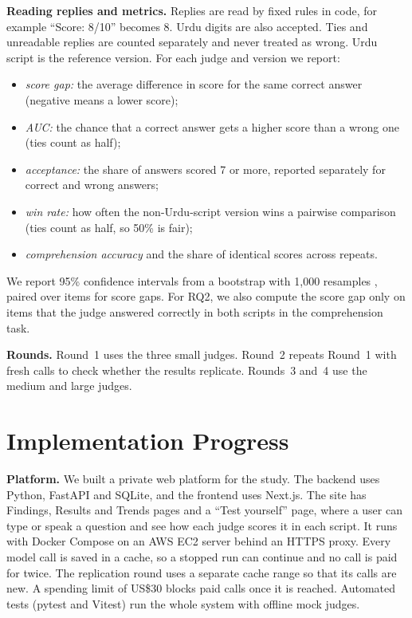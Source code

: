 \documentclass[conference]{IEEEtran}
\begin{document}
\textbf{Reading replies and metrics.} Replies are read by fixed rules in code, for example ``Score: 8/10'' becomes 8.
Urdu digits are also accepted. Ties and unreadable replies are counted separately and never treated as wrong. Urdu
script is the reference version. For each judge and version we report:
\begin{itemize}
\item \emph{score gap:} the average difference in score for the same correct answer (negative means a lower score);
\item \emph{AUC:} the chance that a correct answer gets a higher score than a wrong one (ties count as half);
\item \emph{acceptance:} the share of answers scored 7 or more, reported separately for correct and wrong answers;
\item \emph{win rate:} how often the non-Urdu-script version wins a pairwise comparison (ties count as half, so 50\%
is fair);
\item \emph{comprehension accuracy} and the share of identical scores across repeats.
\end{itemize}
We report 95\% confidence intervals from a bootstrap with 1{,}000 resamples \cite{efron1993bootstrap}, paired over
items for score gaps. For RQ2, we also compute the score gap only on items that the judge answered correctly in both
scripts in the comprehension task.

\textbf{Rounds.} Round~1 uses the three small judges. Round~2 repeats Round~1 with fresh calls to check whether the
results replicate. Rounds~3 and~4 use the medium and large judges.

\section{Implementation Progress}
\label{sec:impl}
\textbf{Platform.} We built a private web platform for the study. The backend uses Python, FastAPI and SQLite, and the
frontend uses Next.js. The site has Findings, Results and Trends pages and a ``Test yourself'' page, where a user can
type or speak a question and see how each judge scores it in each script. It runs with Docker Compose on an AWS EC2
server behind an HTTPS proxy. Every model call is saved in a cache, so a stopped run can continue and no call is paid
for twice. The replication round uses a separate cache range so that its calls are new. A spending limit of US\$30
blocks paid calls once it is reached. Automated tests (pytest and Vitest) run the whole system with offline mock
judges.
\end{document}
